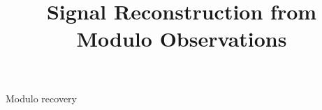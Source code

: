 \documentclass{article}
\title{Signal Reconstruction from Modulo Observations}
\numberwithin{equation}{section}
\begin{document}
	\maketitle
	\ninept
	
	\begin{keywords}
	Modulo recovery 
	\end{keywords}
	
	
	
%	
	
%	
	{{
	\footnotesize
	
	
	}
	}	
\end{document}
